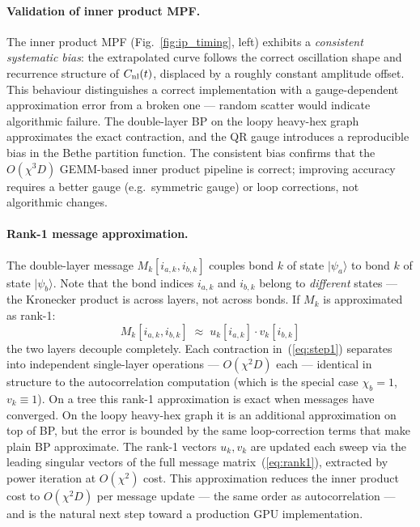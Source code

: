 \documentclass[12pt]{article}
\begin{document}
\paragraph{Validation of inner product MPF.}
The inner product MPF (Fig.~\ref{fig:ip_timing}, left) exhibits a
\emph{consistent systematic bias}: the extrapolated curve follows the
correct oscillation shape and recurrence structure of $C_{\rm nl}(t)$,
displaced by a roughly constant amplitude offset.
This behaviour distinguishes a correct implementation with a
gauge-dependent approximation error from a broken one — random scatter
would indicate algorithmic failure.
The double-layer BP on the loopy heavy-hex graph approximates the
exact contraction, and the QR gauge introduces a reproducible bias in
the Bethe partition function.
The consistent bias confirms that the $O(\chi^3 D)$ GEMM-based
inner product pipeline is correct; improving accuracy requires
a better gauge (e.g.\ symmetric gauge) or loop corrections,
not algorithmic changes.

\paragraph{Rank-1 message approximation.}
The double-layer message $M_k[i_{a,k}, i_{b,k}]$ couples bond $k$ of state
$|\psi_a\rangle$ to bond $k$ of state $|\psi_b\rangle$.
Note that the bond indices $i_{a,k}$ and $i_{b,k}$ belong to \emph{different}
states — the Kronecker product is across layers, not across bonds.
If $M_k$ is approximated as rank-1:
\begin{equation}
    M_k[i_{a,k}, i_{b,k}] \;\approx\; u_k[i_{a,k}]\cdot v_k[i_{b,k}]
    \label{eq:rank1}
\end{equation}
the two layers decouple completely.
Each contraction in~(\ref{eq:step1}) separates into independent single-layer
operations — $O(\chi^2 D)$ each — identical in structure to the
autocorrelation computation (which is the special case $\chi_b=1$,
$v_k \equiv 1$).
On a tree this rank-1 approximation is exact when messages have converged.
On the loopy heavy-hex graph it is an additional approximation on top of BP,
but the error is bounded by the same loop-correction terms that make plain BP
approximate.
The rank-1 vectors $u_k, v_k$ are updated each sweep via the leading singular
vectors of the full message matrix~(\ref{eq:rank1}), extracted by power iteration
at $O(\chi^2)$ cost.
This approximation reduces the inner product cost to $O(\chi^2 D)$ per message
update — the same order as autocorrelation — and is the natural next step
toward a production GPU implementation.
\end{document}
